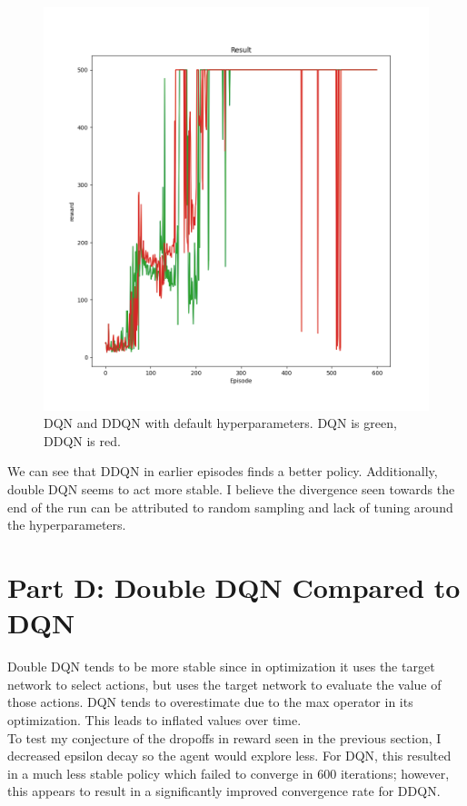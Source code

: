 \documentclass[10pt]{article}
\begin{document}
\begin{figure}[h!]
    \centering
    \includegraphics[scale=0.5]{dqn_green_ddqn_red_final_run.png}
    \caption{DQN and DDQN with default hyperparameters. DQN is green, DDQN is red.}
\end{figure}

We can see that DDQN in earlier episodes finds a better policy. Additionally, double DQN seems to act more stable. I believe the divergence seen towards the end of the run can be attributed to random sampling and lack of tuning around the hyperparameters.  

\newpage

\section{Part D: Double DQN Compared to DQN}

Double DQN tends to be more stable since in optimization it uses the target network to select actions, but uses the target network to evaluate the value of those actions. DQN tends to overestimate due to the max operator in its optimization. This leads to inflated values over time.\\

To test my conjecture of the dropoffs in reward seen in the previous section, I decreased epsilon decay so the agent would explore less. For DQN, this resulted in a much less stable policy which failed to converge in 600 iterations; however, this appears to result in a significantly improved convergence rate for DDQN. 
\end{document}
